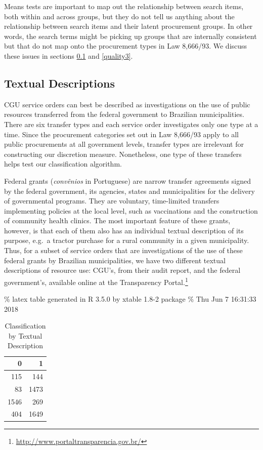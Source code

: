\documentclass[]{article}
\let\rmarkdownfootnote\footnote%
\def\footnote{\protect\rmarkdownfootnote}
\theoremstyle{definition}
\theoremstyle{definition}
\theoremstyle{definition}
\theoremstyle{remark}
\begin{document}
Means tests are important to map out the relationship between search
items, both within and across groups, but they do not tell us anything
about the relationship between search items and their latent procurement
groups. In other words, the search terms might be picking up groups that
are internally consistent but that do not map onto the procurement types
in Law 8,666/93. We discuss these issues in sections \ref{quality2} and
\ref{quality3}.

\hypertarget{quality2}{%
\subsection{Textual Descriptions}\label{quality2}}

CGU service orders can best be described as investigations on the use of
public resources transferred from the federal government to Brazilian
municipalities. There are six transfer types and each service order
investigates only one type at a time. Since the procurement categories
set out in Law 8,666/93 apply to all public procurements at all
government levels, transfer types are irrelevant for constructing our
discretion measure. Nonetheless, one type of these transfers helps test
our classification algorithm.

Federal grants (\emph{convênios} in Portuguese) are narrow transfer
agreements signed by the federal government, its agencies, states and
municipalities for the delivery of governmental programs. They are
voluntary, time-limited transfers implementing policies at the local
level, such as vaccinations and the construction of community health
clinics. The most important feature of these grants, however, is that
each of them also has an individual textual description of its purpose,
e.g.~a tractor purchase for a rural community in a given municipality.
Thus, for a subset of service orders that are investigations of the use
of these federal grants by Brazilian municipalities, we have two
different textual descriptions of resource use: CGU's, from their audit
report, and the federal government's, available online at the
Transparency Portal.\footnote{\url{http://www.portaltransparencia.gov.br/}}

\% latex table generated in R 3.5.0 by xtable 1.8-2 package \% Thu Jun 7
16:31:33 2018

\begin{table}[!htbp]
\centering
\caption{Classification by Textual Description} 
\begin{tabular}{rr}
  \hline
0 & 1 \\ 
  \hline
115 & 144 \\ 
   83 & 1473 \\ 
  1546 & 269 \\ 
  404 & 1649 \\ 
   \hline
\end{tabular}
\end{table}
\end{document}

